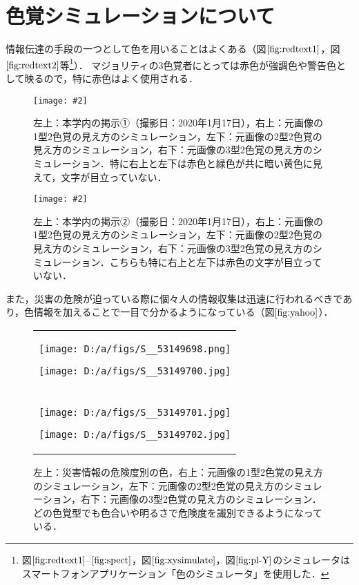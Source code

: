 \documentclass[uplatex,paper=a4,fontsize=4.0truemm,jafontsize=4.0truemm,head_space=30.0truemm,foot_space=30.0truemm,baselineskip=8.0truemm,line_length=40zw,gutter=25.0truemm,oneside,openany,fleqn,hanging_panctuation,open_bracket_pos=nibu_tentsuki,dvipdfmx,jis2004,book,titlepage]{jlreq}
\theoremstyle{mystyle}
\newcommand{\captiondot}[1]{\caption{#1．}}
\newcommand{\figureinput}[4]{\begin{figure}[btp]\centering\texttt{[image: \#2]}\captiondot{#3}\label{fig:#4}\end{figure}}
\newcommand{\mathdisplaystyle}[1]{\(\displaystyle{#1}\)}
\newcommand{\Reference}[1]{\mathdisplaystyle{\ref{#1}}}
\begin{document}
		\section{色覚シミュレーションについて}
			情報伝達の手段の一つとして色を用いることはよくある（図\Reference{fig:redtext1}，図\Reference{fig:redtext2}等\footnote{図\Reference{fig:redtext1}--\protect\Reference{fig:spect}，図\Reference{fig:xysimulate}，図\Reference{fig:pl-Y}のシミュレータはスマートフォンアプリケーション「色のシミュレータ」を使用した．}）．
			マジョリティの3色覚者にとっては赤色が強調色や警告色として映るので，特に赤色はよく使用される．
			\figureinput{width=7.5truecm}{D:/a/figs/S__50315266.jpg}{左上：本学内の掲示①（撮影日：2020年1月17日），右上：元画像の1型2色覚の見え方のシミュレーション，左下：元画像の2型2色覚の見え方のシミュレーション，右下：元画像の3型2色覚の見え方のシミュレーション．特に右上と左下は赤色と緑色が共に暗い黄色に見えて，文字が目立っていない}{redtext1}
			\figureinput{width=7.5truecm}{D:/a/figs/S__50315270.jpg}{左上：本学内の掲示②（撮影日：2020年1月17日），右上：元画像の1型2色覚の見え方のシミュレーション，左下：元画像の2型2色覚の見え方のシミュレーション，右下：元画像の3型2色覚の見え方のシミュレーション．こちらも特に右上と左下は赤色の文字が目立っていない}{redtext2}
			また，災害の危険が迫っている際に個々人の情報収集は迅速に行われるべきであり，色情報を加えることで一目で分かるようになっている（図\Reference{fig:yahoo}\cite{Yahoo2020}）．
			\begin{figure}[tbp]
				\centering
				\begin{tabular}{c}
					\begin{minipage}{0.5\linewidth}
						\centering
						\texttt{[image: D:/a/figs/S\_\_53149698.png]}
					\end{minipage}
					\begin{minipage}{0.5\linewidth}
						\centering
						\texttt{[image: D:/a/figs/S\_\_53149700.jpg]}
					\end{minipage} \\
					\begin{minipage}{0.06\linewidth}
						\vspace{10truemm}
					\end{minipage} \\
					\begin{minipage}{0.5\linewidth}
						\centering
						\texttt{[image: D:/a/figs/S\_\_53149701.jpg]}
					\end{minipage}
					\begin{minipage}{0.5\linewidth}
						\centering
						\texttt{[image: D:/a/figs/S\_\_53149702.jpg]}
					\end{minipage}
				\end{tabular}
				\captiondot{左上：災害情報の危険度別の色，右上：元画像の1型2色覚の見え方のシミュレーション，左下：元画像の2型2色覚の見え方のシミュレーション，右下：元画像の3型2色覚の見え方のシミュレーション．どの色覚型でも色合いや明るさで危険度を識別できるようになっている}\label{fig:yahoo}
			\end{figure}
\end{document}
